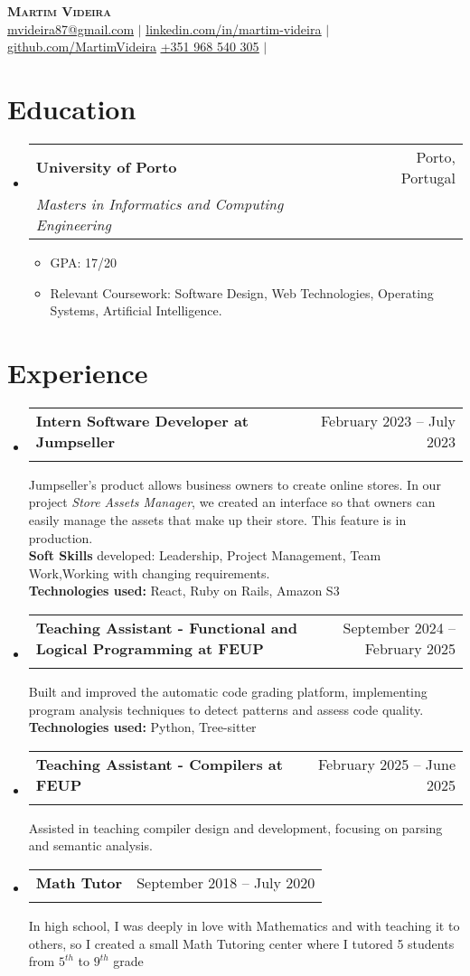 \documentclass[letterpaper,11pt]{article}
\makeatletter
\newcommand{\resumeItem}[1]{
  \item\small{
    {#1 \vspace{-2pt}}
  }
}
\newcommand{\resumeSubheading}[4]{
  \vspace{-2pt}\item
    \begin{tabular*}{0.97\textwidth}[t]{l@{\extracolsep{\fill}}r}
      \textbf{#1} & #2 \\
      \textit{\small#3} & \textit{\small #4} \\
    \end{tabular*}\vspace{-7pt}
}
\newcommand{\resumeSubHeadingListStart}{\begin{itemize}[leftmargin=0.15in, label={}]}
\newcommand{\resumeSubHeadingListEnd}{\end{itemize}}
\newcommand{\resumeItemListStart}{\begin{itemize}}
\newcommand{\resumeItemListEnd}{\end{itemize}\vspace{-5pt}}
\makeatother
\begin{document}
\begin{center}
    \textbf{\Huge \scshape Martim Videira} \\ \vspace{1pt}
    \href{mailto:mvideira87@gmail.com}{\underline{mvideira87@gmail.com}} $|$ 
    \href{https://www.linkedin.com/in/martim-videira-aa766b24b/}{\underline{linkedin.com/in/martim-videira}} $|$
    \href{https://github.com/MartimVideira}{\underline{github.com/MartimVideira}}
    \href{tel:351968540305}{\underline{+351 968 540 305}} $|$
\end{center}


\section{Education}
  \resumeSubHeadingListStart
    \resumeSubheading
      {University of Porto}{Porto, Portugal}
      {Masters in Informatics and Computing Engineering}{}
      \resumeItemListStart
        \resumeItem{GPA: 17/20 }
        \resumeItem{Relevant Coursework: Software Design, Web Technologies, Operating Systems, Artificial Intelligence.}
      \resumeItemListEnd
  \resumeSubHeadingListEnd

\section{Experience}
  \resumeSubHeadingListStart
    \resumeSubheading
      {Intern Software Developer at Jumpseller}{February 2023 -- July 2023}
      {}{}
    Jumpseller's product allows business owners to create online stores. In our project \emph{Store Assets Manager}, we created an interface so that owners can easily manage the assets that make up their store. This feature is in production.
    {\\ \textbf{Soft Skills} developed: Leadership, Project Management, Team Work,Working with changing requirements.\\}
    {\textbf{Technologies used:} React, Ruby on Rails, Amazon S3}
    \resumeSubheading
      {Teaching Assistant - \small{Functional and Logical Programming at FEUP}}{September 2024 -- February 2025}{}{}
      {Built and improved the automatic code grading platform, implementing program analysis techniques to detect patterns and assess code quality.}
    {\textbf{Technologies used:} Python, Tree-sitter}
    \resumeSubheading
      {Teaching Assistant - \small{Compilers at FEUP} }{February 2025 -- June 2025}{}{}
      {Assisted in teaching compiler design and development, focusing on parsing and semantic analysis.}
    \resumeSubheading
      {Math Tutor}{September 2018 -- July 2020}
      {}{}
    {In high school, I was deeply in love with Mathematics and with teaching it to others, so I created a small Math Tutoring center where I tutored 5 students from $5^{th}$  to $9^{th}$ grade}
  \resumeSubHeadingListEnd
\end{document}
